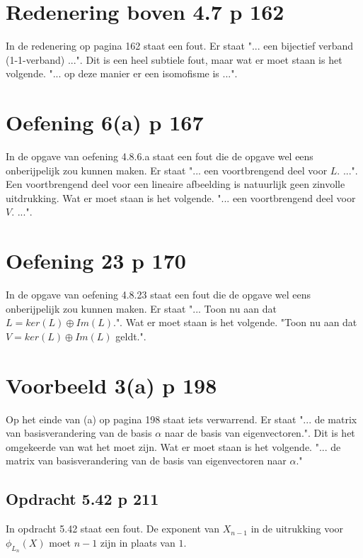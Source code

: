 \documentclass[lineaire_algebra_oplossingen.tex]{subfiles}
\begin{document}
\section{Redenering boven 4.7 p 162}
In de redenering op pagina 162 staat een fout. Er staat "... een bijectief verband (1-1-verband) ...".
Dit is een heel subtiele fout, maar wat er moet staan is het volgende. "... op deze manier er een isomofisme is ...". 

\section{Oefening 6(a) p 167}
In de opgave van oefening 4.8.6.a staat een fout die de opgave wel eens onberijpelijk zou kunnen maken.
Er staat "... een voortbrengend deel voor $L$. ...".
Een voortbrengend deel voor een lineaire afbeelding is natuurlijk geen zinvolle uitdrukking.
Wat er moet staan is het volgende. "... een voortbrengend deel voor $V$. ...".

\section{Oefening 23 p 170}
In de opgave van oefening 4.8.23 staat een fout die de opgave wel eens onberijpelijk zou kunnen maken.
Er staat "... Toon nu aan dat $L = ker(L) \oplus Im(L)$.".
Wat er moet staan is het volgende.
"Toon nu aan dat $V = ker(L) \oplus Im(L)$ geldt.".

\section{Voorbeeld 3(a) p 198}
Op het einde van (a) op pagina 198 staat iets verwarrend.
Er staat "... de matrix van basisverandering van de basis $\alpha$ naar de basis van eigenvectoren.".
Dit is het omgekeerde van wat het moet zijn.
Wat er moet staan is het volgende.
"... de matrix van basisverandering van de basis van eigenvectoren naar $\alpha$."

\subsection{Opdracht 5.42 p 211}
In opdracht 5.42 staat een fout. De exponent van $X_{n-1}$ in de uitrukking voor $\phi_{L_{n}}(X)$ moet $n-1$ zijn in plaats van $1$.
\end{document}

